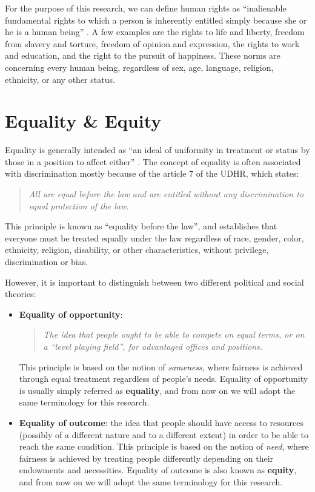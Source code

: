 For the purpose of this research, we can define human rights as ``inalienable fundamental rights to which a person is inherently entitled simply because she or he is a human being'' \cite[p.~3]{sepuldeva2010human}. A few examples are the rights to life and liberty, freedom from slavery and torture, freedom of opinion and expression, the rights to work and education, and the right to the pursuit of happiness. These norms are concerning every human being, regardless of sex, age, language, religion, ethnicity, or any other status.


\section{Equality \& Equity}
\label{section:equality_equity}
Equality is generally intended as ``an ideal of uniformity in treatment or status by those in a position to affect either'' \cite{britannica2009equality}. The concept of equality is often associated with discrimination mostly because of the article 7 of the UDHR, which states:
\begin{quote}\emph{All are equal before the law and are entitled without any discrimination to equal protection of the law.} \cite{assembly1948universal}\end{quote}
This principle is known as ``equality before the law'', and establishes that everyone must be treated equally under the law regardless of race, gender, color, ethnicity, religion, disability, or other characteristics, without privilege, discrimination or bias.

However, it is important to distinguish between two different political and social theories:
\begin{itemize}
\item \textbf{Equality of opportunity}:
\begin{quote}\emph{The idea that people ought to be able to compete on equal terms, or on a ``level playing field'', for advantaged offices and positions.} \cite{britannica2019equal}\end{quote}
This principle is based on the notion of \textit{sameness}, where fairness is achieved through equal treatment regardless of people's needs. Equality of opportunity is usually simply referred as \textbf{equality}, and from now on we will adopt the same terminology for this research.
\item \textbf{Equality of outcome}: the idea that people should have access to resources (possibly of a different nature and to a different extent) in order to be able to reach the same condition. This principle is based on the notion of \textit{need}, where fairness is achieved by treating people differently depending on their endowments and necessities. Equality of outcome is also known as \textbf{equity}, and from now on we will adopt the same terminology for this research.
\end{itemize}


